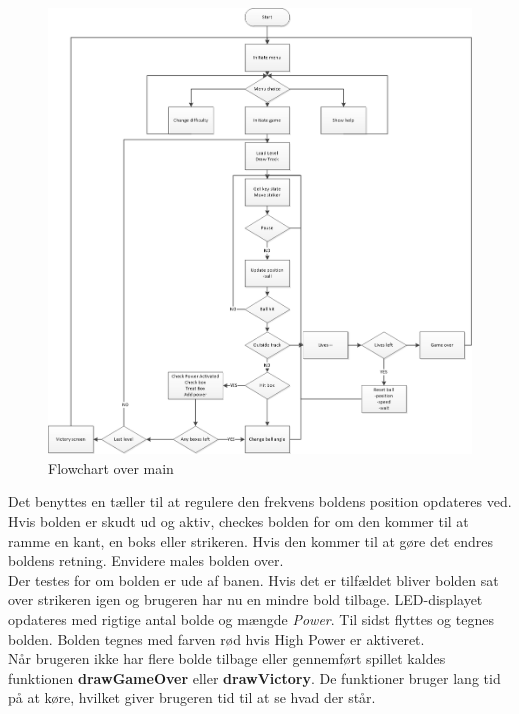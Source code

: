 \begin{figure}[h]
\begin{center}
\includegraphics[scale=0.6]{img/Flow.png}
\caption{Flowchart over main}
\end{center}
\end{figure}

Det benyttes en tæller til at regulere den frekvens boldens position opdateres ved. Hvis bolden er skudt ud og aktiv, checkes bolden for om den kommer til at ramme en kant, en boks eller strikeren. Hvis den kommer til at gøre det endres boldens retning. Envidere males bolden over.\\
Der testes for om bolden er ude af banen. Hvis det er tilfældet bliver bolden sat over strikeren igen og brugeren har nu en mindre bold tilbage. LED-displayet opdateres med rigtige antal bolde og mængde \textit{Power}. Til sidst flyttes og tegnes bolden. Bolden tegnes med farven rød hvis High Power er aktiveret. \\
Når brugeren ikke har flere bolde  tilbage eller gennemført spillet kaldes funktionen \textbf{drawGameOver} eller \textbf{drawVictory}. De funktioner bruger lang tid på at køre, hvilket giver brugeren tid til at se hvad der står.
